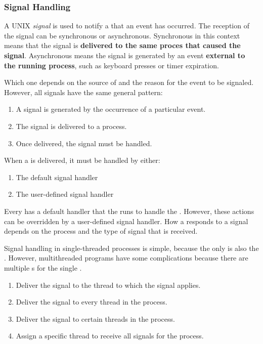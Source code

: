 \subsubsection{Signal Handling}\label{subsubsec:Signal_Handling}
\begin{definition}[Signal]\label{def:Signal}
  A UNIX \emph{signal} is used to notify a  that an event has occurred.
  The reception of the signal can be synchronous or asynchronous.
  Synchronous in this context means that the signal is \textbf{delivered to the same proces that caused the signal}.
  Asynchronous means the signal is generated by an event \textbf{external to the running process}, such as keyboard presses or timer expiration.

  Which one depends on the source of and the reason for the event to be signaled.
  However, all signals have the same general pattern:
  \begin{enumerate}[noitemsep]
  \item A signal is generated by the occurrence of a particular event.
  \item The signal is delivered to a process.
  \item Once delivered, the signal must be handled.
  \end{enumerate}
\end{definition}

When a  is delivered, it must be handled by either:
\begin{enumerate}[noitemsep]
\item The default signal handler
\item The user-defined signal handler
\end{enumerate}

Every  has a default handler that the  runs to handle the .
However, these actions can be overridden by a user-defined signal handler.
How a  responds to a signal depends on the process and the type of signal that is received.

Signal handling in single-threaded processes is simple, because the only  is also the .
However, multithreaded programs have some complications because there are multiple s for the single .
\begin{enumerate}[noitemsep]
\item Deliver the signal to the thread to which the signal applies.
\item Deliver the signal to every thread in the process.
\item Deliver the signal to certain threads in the process.
\item Assign a specific thread to receive all signals for the process.
\end{enumerate}

